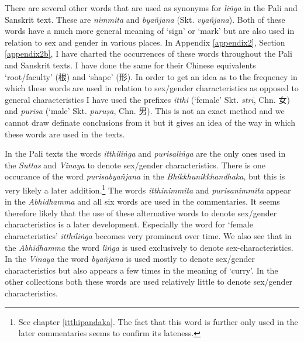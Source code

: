There are several other words that are used as synonyms for \textit{liṅga} in the Pali and Sanskrit text. These are \textit{nimmita} and \textit{byañjana} (Skt. \textit{vyañjana}). Both of these words have a much more general meaning of `sign' or `mark' but are also used in relation to sex and gender in various places. In Appendix \ref{appendix2}, Section \ref{appendix2b}, I have charted the occurrences of these words throughout the Pali and Sanskrit texts. I have done the same for their Chinese equivalents `root/faculty' (根) and `shape' (形). In order to get an idea as to the frequency in which these words are used in relation to sex/gender characteristics as opposed to general characteristics I have used the prefixes \textit{itthi} (`female' Skt. \textit{strī}, Chn. 女) and \textit{purisa} (`male' Skt. \textit{puruṣa}, Chn. 男). This is not an exact method and we cannot draw definate conclusions from it but it gives an idea of the way in which these words are used in the texts.

In the Pali texts the words \textit{itthiliṅga} and \textit{purisaliṅga} are the only ones used in the \textit{Suttas} and \textit{Vinaya} to denote sex/gender characteristics. There is one occurance of the word \textit{purisabyañjana} in the \textit{Bhikkhunikkhandhaka}, but this is very likely a later addition.\footnote{See chapter \ref{itthipandaka}. The fact that this word is further only used in the later commentaries seems to confirm its lateness.}  The words \textit{itthinimmita} and \textit{purisanimmita} appear in the \textit{Abhidhamma} and all six words are used in the commentaries. It seems therefore likely that the use of these alternative words to denote sex/gender characteristics is a later development. Especially the word for `female characteristics' \textit{itthiliṅga} becomes very prominent over time. We also see that in the \textit{Abhidhamma} the word \textit{liṅga} is used exclusively to denote sex-characteristics. In the \textit{Vinaya} the word \textit{byañjana} is used mostly to denote sex/gender characteristics but also appears a few times in the meaning of `curry'. In the other collections both these words are used relatively little to denote sex/gender characteristics. 

